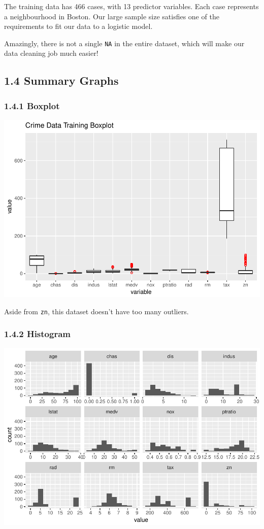 \documentclass[]{article}
\begin{document}
The training data has 466 cases, with 13 predictor variables. Each case
represents a neighbourhood in Boston. Our large sample size satisfies
one of the requirements to fit our data to a logistic model.

Amazingly, there is not a single \texttt{NA} in the entire dataset,
which will make our data cleaning job much easier!

\subsection{1.4 Summary Graphs}\label{summary-graphs}

\subsubsection{1.4.1 Boxplot}\label{boxplot}

\includegraphics{DATA_621_Homework_3_files/figure-latex/summary-boxplot-1.pdf}

Aside from \texttt{zn}, this dataset doesn't have too many outliers.

\hypertarget{histogram}{\subsubsection{1.4.2
Histogram}\label{histogram}}

\includegraphics{DATA_621_Homework_3_files/figure-latex/summary-histogram-1.pdf}
\end{document}
